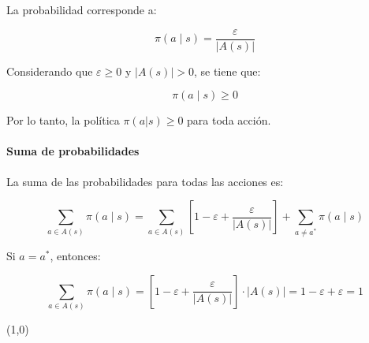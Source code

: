 La probabilidad corresponde a:

\[
    \pi \left(a \mid s\right) = \frac{\varepsilon}{|A(s)|}
\]

Considerando que $\varepsilon \geq 0$ y $|A(s)| > 0$, se tiene que:

\[
    \pi \left(a \mid s\right) \geq 0
\]

Por lo tanto, la política $\pi(a|s) \geq 0$ para toda acción.

\paragraph{Suma de probabilidades}

La suma de las probabilidades para todas las acciones es:

\[
    \sum_{a \in A(s)} \pi \left(a \mid s\right) = \sum_{a \in A(s)} \left[1 - \varepsilon + \frac{\varepsilon}{|A(s)|}\right]  + \sum_{a \neq a^{\ast}} \pi \left(a \mid s\right)
\]

Si $a = a^{\ast}$, entonces:

\[
    \sum_{a \in A(s)} \pi \left(a \mid s\right) = \left[1 - \varepsilon + \frac{\varepsilon}{|A(s)|}\right] \cdot |A(s)| = 1 - \varepsilon + \varepsilon = 1
\]


\line(1,0){\textwidth}
